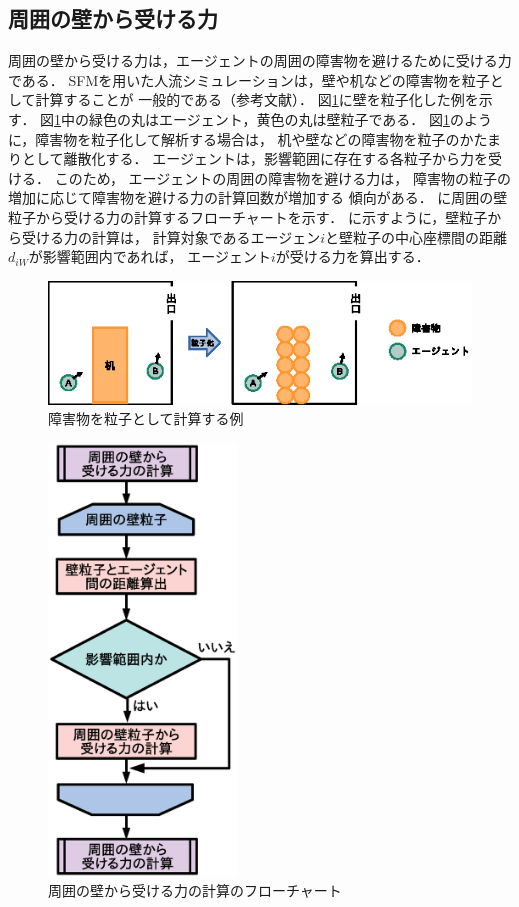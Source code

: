 \subsection{周囲の壁から受ける力}
周囲の壁から受ける力は，エージェントの周囲の障害物を避けるために受ける力である．
SFMを用いた人流シミュレーションは，壁や机などの障害物を粒子として計算することが
一般的である（参考文献）．
図\ref{fig:kaberyuusi_ex}に壁を粒子化した例を示す．
図\ref{fig:kaberyuusi_ex}中の緑色の丸はエージェント，黄色の丸は壁粒子である．
図\ref{fig:kaberyuusi_ex}のように，障害物を粒子化して解析する場合は，
机や壁などの障害物を粒子のかたまりとして離散化する．
エージェントは，影響範囲に存在する各粒子から力を受ける．
このため，
エージェントの周囲の障害物を避ける力は，
障害物の粒子の増加に応じて障害物を避ける力の計算回数が増加する
傾向がある．
に周囲の壁粒子から受ける力の計算するフローチャートを示す．
に示すように，壁粒子から受ける力の計算は，
計算対象であるエージェン$i$と壁粒子の中心座標間の距離$d_{iW}$が影響範囲内であれば，
エージェント$i$が受ける力を算出する．


\begin{figure}[t]
 \begin{center}
  \includegraphics[width=11.5cm,clip]{figure/shougaibutu_ryuusika.eps}
  \caption{障害物を粒子として計算する例}
  \label{fig:kaberyuusi_ex}
 \end{center}
\end{figure}


\begin{figure}[t]
 \begin{center}
  \includegraphics[width=5cm,clip]{figure/kabe_flow.eps}
  \caption{周囲の壁から受ける力の計算のフローチャート}
  \label{fig:kabe_flowchart}
 \end{center}
\end{figure}

